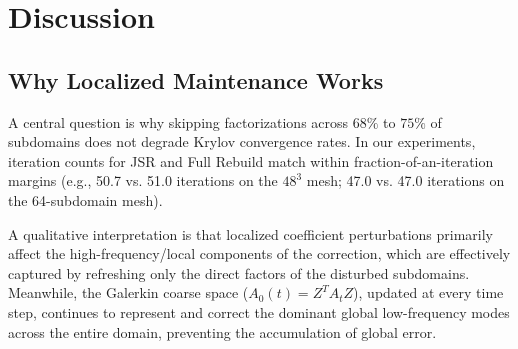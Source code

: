 \documentclass[preprint,12pt,3p]{elsarticle}
\begin{document}
\section{Discussion}
\label{sec:discussion}

\subsection{Why Localized Maintenance Works}
A central question is why skipping factorizations across $68\%$ to $75\%$ of subdomains does not degrade Krylov convergence rates. In our experiments, iteration counts for JSR and Full Rebuild match within fraction-of-an-iteration margins (e.g., 50.7 vs. 51.0 iterations on the $48^3$ mesh; 47.0 vs. 47.0 iterations on the 64-subdomain mesh).

A qualitative interpretation is that localized coefficient perturbations primarily affect the high-frequency/local components of the correction, which are effectively captured by refreshing only the direct factors of the disturbed subdomains. Meanwhile, the Galerkin coarse space ($A_0(t) = Z^T A_t Z$), updated at every time step, continues to represent and correct the dominant global low-frequency modes across the entire domain, preventing the accumulation of global error.
\end{document}
